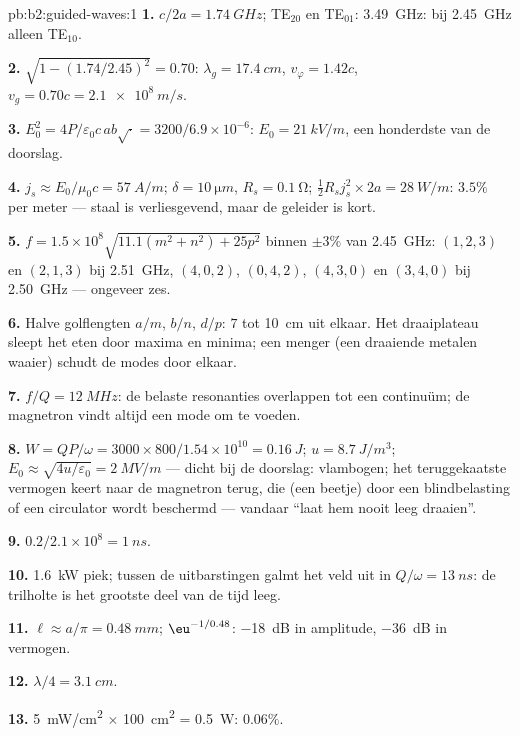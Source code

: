 \begin{solution}{pb:b2:guided-waves:1}
\textbf{1.} $c/2a = \qty{1.74}{GHz}$; TE$_{20}$ en TE$_{01}$:
\qty{3.49}{GHz}: bij \qty{2.45}{GHz} alleen TE$_{10}$.

\textbf{2.} $\sqrt{1 - (1.74/2.45)^2} = 0.70$: $\lambda_g = \qty{17.4}{cm}$,
$v_\varphi = 1.42c$, $v_g = 0.70c = \qty{2.1e8}{m/s}$.

\textbf{3.}
$E_0^2 = 4P/\varepsilon_0c\,ab\sqrt{\cdot} = 3200/6.9 \times 10^{-6}$:
$E_0 = \qty{21}{kV/m}$, een honderdste van de doorslag.

\textbf{4.} $j_s \approx E_0/\mu_0c = \qty{57}{A/m}$;
$\delta = \qty{10}{\micro m}$, $R_s = \qty{0.1}{\ohm}$;
$\tfrac12R_sj_s^2 \times 2a = \qty{28}{W/m}$: $3.5\%$ per meter --- staal is
verliesgevend, maar de geleider is kort.

\textbf{5.} $f = 1.5 \times 10^8\sqrt{11.1(m^2 + n^2) + 25p^2}$ binnen
$\pm3\%$ van \qty{2.45}{GHz}: $(1, 2, 3)$ en $(2, 1, 3)$ bij
\qty{2.51}{GHz}, $(4, 0, 2)$, $(0, 4, 2)$, $(4, 3, 0)$ en $(3, 4, 0)$ bij
\qty{2.50}{GHz} --- ongeveer zes.

\textbf{6.} Halve golflengten $a/m$, $b/n$, $d/p$: $7$ tot \qty{10}{cm} uit
elkaar. Het draaiplateau sleept het eten door maxima en minima; een menger
(een draaiende metalen waaier) schudt de modes door elkaar.

\textbf{7.} $f/Q = \qty{12}{MHz}$: de belaste resonanties overlappen tot een
continuüm; de magnetron vindt altijd een mode om te voeden.

\textbf{8.}
$W = QP/\omega = 3000 \times 800/1.54 \times 10^{10} = \qty{0.16}{J}$;
$u = \qty{8.7}{J/m^3}$;
$E_0 \approx \sqrt{4u/\varepsilon_0} = \qty{2}{MV/m}$ --- dicht bij de
doorslag: vlambogen; het teruggekaatste vermogen keert naar de magnetron
terug, die (een beetje) door een blindbelasting of een circulator wordt
beschermd --- vandaar ``laat hem nooit leeg draaien''.

\textbf{9.} $0.2/2.1 \times 10^8 = \qty{1}{ns}$.

\textbf{10.} \qty{1.6}{kW} piek; tussen de uitbarstingen galmt het veld uit
in $Q/\omega = \qty{13}{ns}$: de trilholte is het grootste deel van de tijd
leeg.

\textbf{11.} $\ell \approx a/\pi = \qty{0.48}{mm}$; $\eu^{-1/0.48}$:
\qty{-18}{dB} in amplitude, \qty{-36}{dB} in vermogen.

\textbf{12.} $\lambda/4 = \qty{3.1}{cm}$.

\textbf{13.} \qty{5}{mW/cm^2} $\times$ \qty{100}{cm^2} = \qty{0.5}{W}: $0.06\%$.


\end{solution}
